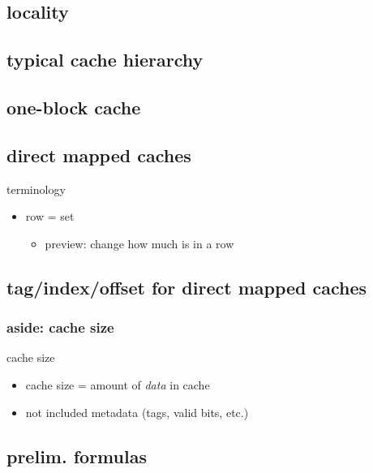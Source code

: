 \subsection{locality}


\subsection{typical cache hierarchy}


\subsection{one-block cache}


\subsection{direct mapped caches}


\begin{frame}{terminology}
    \begin{itemize}
    \item row = set
        \begin{itemize}
        \item preview: change how much is in a row
        \end{itemize}
    \end{itemize}
\end{frame}

\subsection{tag/index/offset for direct mapped caches}


\subsubsection{aside: cache size}
\begin{frame}{cache size}
    \begin{itemize}
    \item cache size = amount of \textit{data} in cache
    \item not included metadata (tags, valid bits, etc.)
    \end{itemize}
\end{frame}

\subsection{prelim. formulas}


